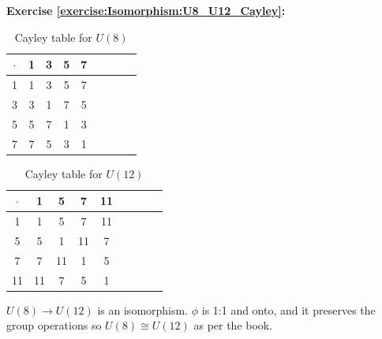 \noindent\textbf{Exercise \ref{exercise:Isomorphism:U8_U12_Cayley}:}
\begin{multicols}{2}

\begin{table}[H]
\caption{Cayley table for $U(8)$}
{\small
\begin{center}
\begin{tabular}{c|cccccccc}
$\cdot$ & 1 & 3 & 5 & 7  \\
\hline
1        & 1 & 3 & 5 & 7  \\
3       & 3 & 1 & 7 & 5  \\
5       & 5 & 7 & 1 & 3 \\
7       & 7 & 5 & 3 & 1 \\
\end{tabular}
\end{center}
}
\end{table}

\begin{table}[H]
\caption{Cayley table for $U(12)$}
{\small
\begin{center}
\begin{tabular}{c|cccccccc}
$\cdot$ & 1 & 5 & 7 & 11  \\
\hline
1        & 1 & 5 & 7 & 11  \\
5       & 5 & 1 & 11 & 7 \\
7       & 7 & 11 & 1 & 5  \\
11      & 11 & 7 & 5 & 1 \\
\end{tabular}
\end{center}
}
\end{table}
\end{multicols}
\noindent $U(8)  \rightarrow U(12)$ is an isomorphism.  $\phi$ is 1:1 and onto, and it preserves the group operations so $U(8) \cong U(12)$ as per the book. 
\\
\\

